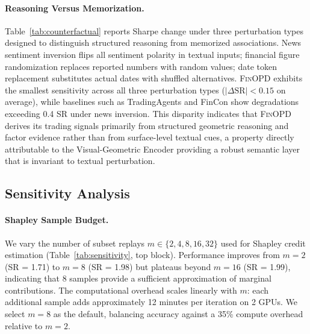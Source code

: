 

\paragraph{Reasoning Versus Memorization.} Table~\ref{tab:counterfactual} reports Sharpe change under three perturbation types designed to distinguish structured reasoning from memorized associations. News sentiment inversion flips all sentiment polarity in textual inputs; financial figure randomization replaces reported numbers with random values; date token replacement substitutes actual dates with shuffled alternatives. \textsc{FinOPD} exhibits the smallest sensitivity across all three perturbation types ($|\Delta\text{SR}| < 0.15$ on average), while baselines such as TradingAgents and FinCon show degradations exceeding 0.4 SR under news inversion. This disparity indicates that \textsc{FinOPD} derives its trading signals primarily from structured geometric reasoning and factor evidence rather than from surface-level textual cues, a property directly attributable to the Visual-Geometric Encoder providing a robust semantic layer that is invariant to textual perturbation.

\subsection{Sensitivity Analysis}



\paragraph{Shapley Sample Budget.} We vary the number of subset replays $m \in \{2, 4, 8, 16, 32\}$ used for Shapley credit estimation (Table~\ref{tab:sensitivity}, top block). Performance improves from $m{=}2$ (SR = 1.71) to $m{=}8$ (SR = 1.98) but plateaus beyond $m{=}16$ (SR = 1.99), indicating that 8 samples provide a sufficient approximation of marginal contributions. The computational overhead scales linearly with $m$: each additional sample adds approximately 12 minutes per iteration on 2 GPUs. We select $m{=}8$ as the default, balancing accuracy against a 35\% compute overhead relative to $m{=}2$.

